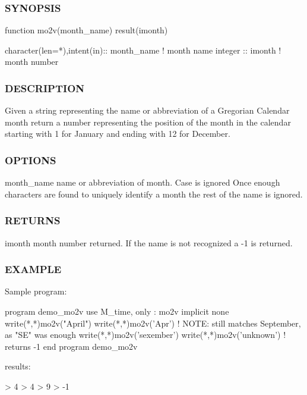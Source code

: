 \subsubsection*{S\+Y\+N\+O\+P\+S\+IS}

\begin{DoxyVerb}function mo2v(month_name) result(imonth)

  character(len=*),intent(in):: month_name ! month name
  integer                    :: imonth     ! month number
\end{DoxyVerb}


\subsubsection*{D\+E\+S\+C\+R\+I\+P\+T\+I\+ON}

Given a string representing the name or abbreviation of a Gregorian Calendar month return a number representing the position of the month in the calendar starting with 1 for January and ending with 12 for December.

\subsubsection*{O\+P\+T\+I\+O\+NS}

month\+\_\+name name or abbreviation of month. Case is ignored Once enough characters are found to uniquely identify a month the rest of the name is ignored. \subsubsection*{R\+E\+T\+U\+R\+NS}

imonth month number returned. If the name is not recognized a -\/1 is returned.

\subsubsection*{E\+X\+A\+M\+P\+LE}

\begin{DoxyVerb}Sample program:

 program demo_mo2v
 use M_time, only : mo2v
 implicit none
    write(*,*)mo2v("April")
    write(*,*)mo2v('Apr')
    ! NOTE: still matches September, as "SE" was enough
    write(*,*)mo2v('sexember')
    write(*,*)mo2v('unknown')  ! returns -1
 end program demo_mo2v

results:

   >  4
   >  4
   >  9
   > -1
\end{DoxyVerb}


